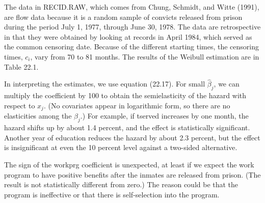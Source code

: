\documentclass[10pt]{article}
\begin{document}
The data in RECID.RAW, which comes from Chung, Schmidt, and Witte (1991), are flow data because it is a random sample of convicts released from prison during the period July 1, 1977, through June 30, 1978. The data are retrospective in that they were obtained by looking at records in April 1984, which served as the common censoring date. Because of the different starting times, the censoring times, $c_{i}$, vary from 70 to 81 months. The results of the Weibull estimation are in Table 22.1.

In interpreting the estimates, we use equation (22.17). For small $\hat{\beta}_{j}$, we can multiply the coefficient by 100 to obtain the semielasticity of the hazard with respect to $x_{j}$. (No covariates appear in logarithmic form, so there are no elasticities among the $\hat{\beta}_{j}$.) For example, if tserved increases by one month, the hazard shifts up by about 1.4 percent, and the effect is statistically significant. Another year of education reduces the hazard by about 2.3 percent, but the effect is insignificant at even the 10 percent level against a two-sided alternative.

The sign of the workprg coefficient is unexpected, at least if we expect the work program to have positive benefits after the inmates are released from prison. (The result is not statistically different from zero.) The reason could be that the program is ineffective or that there is self-selection into the program.
\end{document}
